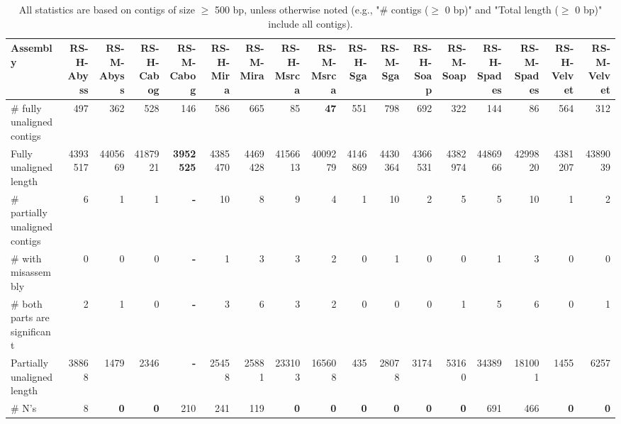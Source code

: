\documentclass[12pt,a4paper]{article}
\begin{document}
\begin{table}[ht]
\begin{center}
\caption{All statistics are based on contigs of size $\geq$ 500 bp, unless otherwise noted (e.g., "\# contigs ($\geq$ 0 bp)" and "Total length ($\geq$ 0 bp)" include all contigs).}
\begin{tabular}{|l*{16}{|r}|}
\hline
Assembly & RS-H-Abyss & RS-M-Abyss & RS-H-Cabog & RS-M-Cabog & RS-H-Mira & RS-M-Mira & RS-H-Msrca & RS-M-Msrca & RS-H-Sga & RS-M-Sga & RS-H-Soap & RS-M-Soap & RS-H-Spades & RS-M-Spades & RS-H-Velvet & RS-M-Velvet \\ \hline
\# fully unaligned contigs & 497 & 362 & 528 & 146 & 586 & 665 & 85 & {\bf 47} & 551 & 798 & 692 & 322 & 144 & 86 & 564 & 312 \\ \hline
Fully unaligned length & 4393517 & 4405669 & 4187921 & {\bf 3952525} & 4385470 & 4469428 & 4156613 & 4009279 & 4146869 & 4430364 & 4366531 & 4382974 & 4486966 & 4299820 & 4381207 & 4389039 \\ \hline
\# partially unaligned contigs & 6 & 1 & 1 & {\bf -} & 10 & 8 & 9 & 4 & 1 & 10 & 2 & 5 & 5 & 10 & 1 & 2 \\ \hline
\hspace{5mm}\# with misassembly & 0 & 0 & 0 & {\bf -} & 1 & 3 & 3 & 2 & 0 & 1 & 0 & 0 & 1 & 3 & 0 & 0 \\ \hline
\hspace{5mm}\# both parts are significant & 2 & 1 & 0 & {\bf -} & 3 & 6 & 3 & 2 & 0 & 0 & 0 & 1 & 5 & 6 & 0 & 1 \\ \hline
Partially unaligned length & 38868 & 1479 & 2346 & {\bf -} & 25458 & 25881 & 233103 & 165608 & 435 & 28078 & 3174 & 53160 & 34389 & 181001 & 1455 & 6257 \\ \hline
\# N's & 8 & {\bf 0} & {\bf 0} & 210 & 241 & 119 & {\bf 0} & {\bf 0} & {\bf 0} & {\bf 0} & {\bf 0} & {\bf 0} & 691 & 466 & {\bf 0} & {\bf 0} \\ \hline
\end{tabular}
\end{center}
\end{table}
\end{document}
